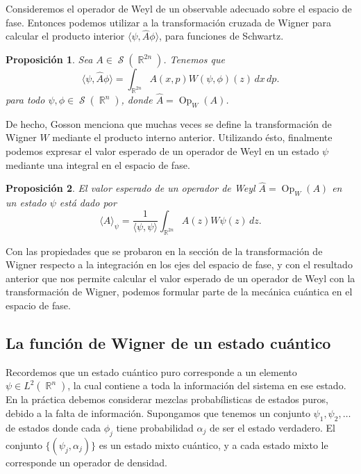 \documentclass[a4paper]{report}
\DeclareMathOperator{\R}{\mathbb{R}}
\DeclareMathOperator{\Sz}{\mathcal S}
\DeclareMathOperator{\Op}{Op}
\newtheorem{proposition}{Proposición}
\begin{document}
  Consideremos el operador de Weyl de un observable adecuado
  sobre el espacio de fase. Entonces podemos utilizar a la
  transformación cruzada de Wigner para calcular el producto
  interior $\langle \psi, \hat{A}\phi \rangle$, para
  funciones de Schwartz.
  \begin{proposition}
    \label{prop:wigner-weyl}
    Sea $A \in \Sz(\R^{2n})$. Tenemos que
    \begin{equation}
      \langle \psi, \hat{A}\phi \rangle
      = \int_{\R^{2n}} A(x,p)W(\psi,\phi)(z) \, dx \, dp.
    \end{equation}
    para todo $\psi, \phi \in \Sz(\R^{n})$, donde $\hat{A} =
    \Op_W(A)$.
  \end{proposition}
  De hecho, Gosson menciona que muchas veces se define la
  transformación de Wigner $W$ mediante el producto interno
  anterior. Utilizando ésto, finalmente podemos expresar el
  valor esperado de un operador de Weyl en un estado $\psi$
  mediante una integral en el espacio de fase.
  \begin{proposition}
    El valor esperado de un operador de Weyl $\hat{A} =
    \Op_W(A)$ en un estado $\psi$ está dado por
    \begin{equation}
      \langle \hat{A} \rangle_\psi
      = \frac{1}{\langle \psi, \psi \rangle} 
      \int_{\R^{2n}} A(z) W\psi(z) \, dz.
    \end{equation}
  \end{proposition}  

  Con las propiedades que se probaron en la sección de la
  transformación de Wigner respecto a la integración en los
  ejes del espacio de fase, y con el resultado anterior que
  nos permite calcular el valor esperado de un operador de
  Weyl con la transformación de Wigner, podemos formular
  parte de la mecánica cuántica en el espacio de fase.

  \subsection{La función de Wigner de un estado cuántico}

  Recordemos que un estado cuántico puro corresponde a un
  elemento $\psi \in L^2(\R^{n})$, la cual contiene a toda
  la información del sistema en ese estado. En la práctica
  debemos considerar mezclas probabílisticas de estados
  puros, debido a la falta de información. Supongamos que
  tenemos un conjunto $\psi_1,\psi_2,\ldots$ de estados
  donde cada $\phi_j$ tiene probabilidad $\alpha_j$ de ser
  el estado verdadero. El conjunto $\{(\psi_j,\alpha_j)\}$
  es un estado mixto cuántico, y a cada estado mixto le
  corresponde un operador de densidad.
\end{document}
